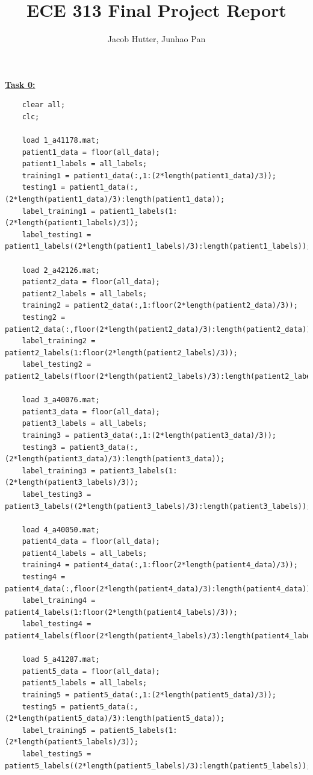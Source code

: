 \documentclass{article}
\author{Jacob Hutter, Junhao Pan}
\title{ECE 313 Final Project Report}
\begin{document}
\maketitle


\underline{\textbf{Task 0:}}
\begin{lstlisting}
    clear all;
    clc;

    load 1_a41178.mat;
    patient1_data = floor(all_data);
    patient1_labels = all_labels;
    training1 = patient1_data(:,1:(2*length(patient1_data)/3));
    testing1 = patient1_data(:,(2*length(patient1_data)/3):length(patient1_data));
    label_training1 = patient1_labels(1:(2*length(patient1_labels)/3));
    label_testing1 = patient1_labels((2*length(patient1_labels)/3):length(patient1_labels));

    load 2_a42126.mat;
    patient2_data = floor(all_data);
    patient2_labels = all_labels;
    training2 = patient2_data(:,1:floor(2*length(patient2_data)/3));
    testing2 = patient2_data(:,floor(2*length(patient2_data)/3):length(patient2_data));
    label_training2 = patient2_labels(1:floor(2*length(patient2_labels)/3));
    label_testing2 = patient2_labels(floor(2*length(patient2_labels)/3):length(patient2_labels));

    load 3_a40076.mat;
    patient3_data = floor(all_data);
    patient3_labels = all_labels;
    training3 = patient3_data(:,1:(2*length(patient3_data)/3));
    testing3 = patient3_data(:,(2*length(patient3_data)/3):length(patient3_data));
    label_training3 = patient3_labels(1:(2*length(patient3_labels)/3));
    label_testing3 = patient3_labels((2*length(patient3_labels)/3):length(patient3_labels));

    load 4_a40050.mat;
    patient4_data = floor(all_data);
    patient4_labels = all_labels;
    training4 = patient4_data(:,1:floor(2*length(patient4_data)/3));
    testing4 = patient4_data(:,floor(2*length(patient4_data)/3):length(patient4_data));
    label_training4 = patient4_labels(1:floor(2*length(patient4_labels)/3));
    label_testing4 = patient4_labels(floor(2*length(patient4_labels)/3):length(patient4_labels));

    load 5_a41287.mat;
    patient5_data = floor(all_data);
    patient5_labels = all_labels;
    training5 = patient5_data(:,1:(2*length(patient5_data)/3));
    testing5 = patient5_data(:,(2*length(patient5_data)/3):length(patient5_data));
    label_training5 = patient5_labels(1:(2*length(patient5_labels)/3));
    label_testing5 = patient5_labels((2*length(patient5_labels)/3):length(patient5_labels));


\end{lstlisting}
\end{document}
